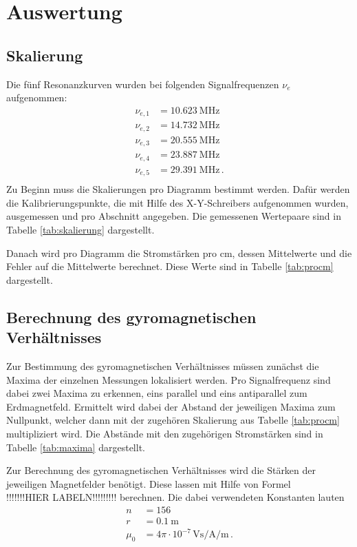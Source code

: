 \section{Auswertung}
\subsection{Skalierung}
Die fünf Resonanzkurven wurden bei folgenden Signalfrequenzen $\nu_e$ aufgenommen:
\begin{align*}
  \nu_{e, 1} &= \SI{10.623}{\mega\hertz} \\
  \nu_{e, 2} &= \SI{14.732}{\mega\hertz} \\
  \nu_{e, 3} &= \SI{20.555}{\mega\hertz} \\
  \nu_{e, 4} &= \SI{23.887}{\mega\hertz} \\
  \nu_{e, 5} &= \SI{29.391}{\mega\hertz}\, . \\
\end{align*}
Zu Beginn muss die Skalierungen pro Diagramm bestimmt werden. Dafür
werden die Kalibrierungspunkte, die mit Hilfe des X-Y-Schreibers aufgenommen wurden,
ausgemessen
und pro Abschnitt angegeben. Die gemessenen Wertepaare sind in Tabelle
\ref{tab:skalierung} dargestellt.


Danach wird pro Diagramm die Stromstärken pro $\si{\centi\meter}$, dessen
Mittelwerte und die Fehler auf die Mittelwerte berechnet. Diese Werte sind
in Tabelle \ref{tab:procm} dargestellt.



\subsection{Berechnung des gyromagnetischen Verhältnisses}
Zur Bestimmung des gyromagnetischen Verhältnisses müssen zunächst die Maxima
der einzelnen Messungen lokalisiert werden. Pro Signalfrequenz sind dabei zwei
Maxima zu erkennen, eins parallel und eins antiparallel zum Erdmagnetfeld.
Ermittelt wird dabei der Abstand der jeweiligen Maxima zum Nullpunkt, welcher
dann mit der zugehören Skalierung aus Tabelle \ref{tab:procm} multipliziert
wird. Die Abstände mit den zugehörigen Stromstärken sind in Tabelle
\ref{tab:maxima} dargestellt.



Zur Berechnung des gyromagnetischen Verhältnisses wird die Stärken der jeweiligen
Magnetfelder benötigt. Diese lassen mit Hilfe von Formel\\
 !!!!!!!HIER LABELN!!!!!!!!!
berechnen. Die dabei verwendeten Konstanten \cite{skript} \cite{indu} lauten
\begin{align*}
  n &= 156 \\
  r &= \SI{0.1}{\meter} \\
  \mu_0 &= 4 \pi \cdot 10^{-7}\, \si{\volt\second\per\ampere\per\meter} \, .\\
\end{align*}

